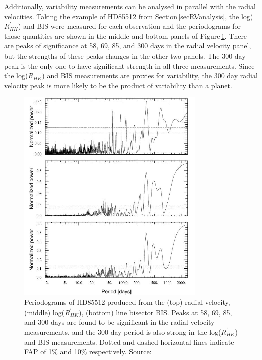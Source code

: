 Additionally, variability measurements can be analysed in parallel with the radial velocities. Taking the example of HD85512 from Section\,\ref{secRVanalysis}, the log($R^{\prime}_{HK}$) and BIS were measured for each observation and the periodograms for those quantities are shown in the middle and bottom panels of Figure\,\ref{figHD85512Periodogram}. There are peaks of significance at 58, 69, 85, and 300 days in the radial velocity panel, but the strengths of these peaks changes in the other two panels. The 300 day peak is the only one to have significant strength in all three measurements. Since the log($R^{\prime}_{HK}$) and BIS measurements are proxies for variability, the 300 day radial velocity peak is more likely to be the product of variability than a planet.\\

\begin{figure}
    \centering
    \includegraphics[width=0.8\textwidth]{HD85512_Periodogram.jpg}
    \caption{Periodograms of HD85512 produced from the (top) radial velocity, (middle) log($R^{\prime}_{HK}$), (bottom) line bisector BIS. Peaks at 58, 69, 85, and 300 days are found to be significant in the radial velocity measurements, and the 300 day period is also strong in the log($R^{\prime}_{HK}$) and BIS measurements. Dotted and dashed horizontal lines indicate FAP of 1\% and 10\% respectively. Source: \citet{2011Pepe}}
    \label{figHD85512Periodogram}
\end{figure}

